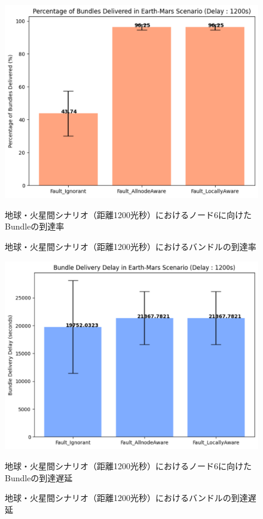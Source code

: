 \begin{figure}[tbh]
    \centering
    \includegraphics[width=0.7\textheight]{results/mars_distance_1200/mars_1200_bundle.pdf}
    \caption{地球・火星間シナリオ（距離1200光秒）におけるバンドルの到達率}
    \label{fig:graph_bundle_earth_mars_1200}
    \begin{minipage}{\textwidth}
        \centering
        \vspace{3mm}
        地球・火星間シナリオ（距離1200光秒）におけるノード6に向けたBundleの到達率
    \end{minipage}
\end{figure}

\begin{figure}[tbh]
    \centering
    \includegraphics[width=0.7\textheight]{results/mars_distance_1200/mars_1200_delay.pdf}
    \caption{地球・火星間シナリオ（距離1200光秒）におけるバンドルの到達遅延}
    \label{fig:graph_delay_earth_mars_1200}
    \begin{minipage}{\textwidth}
        \centering
        \vspace{3mm}
        地球・火星間シナリオ（距離1200光秒）におけるノード6に向けたBundleの到達遅延
    \end{minipage}
\end{figure}


